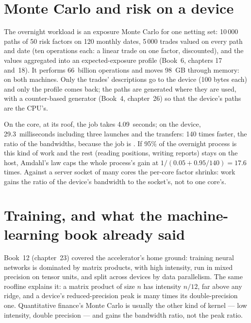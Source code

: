 \section{Monte Carlo and risk on a device}

The overnight workload is an exposure Monte Carlo for one netting set: 10\,000 paths of 50 risk factors on 120 monthly dates, 5\,000 trades
valued on every path and date (ten operations each: a linear trade on one factor, discounted), and the values aggregated into an
expected-exposure profile (Book~6, chapters 17 and~18). It performs 66~billion operations and moves 98~GB through memory:  on both
machines. Only the trades' descriptions go to the device (100 bytes each) and only the profile comes back; the paths are generated where
they are used, with a counter-based generator (Book~4, chapter~26) so that the device's paths are the CPU's.

\label{lst:pl:accelerators-for-quantitative-work:model}

On the core, at its roof, the job takes 4.09~seconds; on the device, 29.3~milliseconds including three launches and the transfers: 140 times
faster, the ratio of the bandwidths, because the job is . If 95\% of the overnight process is this kind of work and the rest
(reading positions, writing reports) stays on the host, Amdahl's law caps the whole process's gain at $1/(0.05 + 0.95/140) = 17.6$ times.
Against a server socket of many cores the per-core factor shrinks:  work gains the ratio of the device's bandwidth to the
socket's, not to one core's.

\section{Training, and what the machine-learning book already said}

Book~12 (chapter~23) covered the accelerator's home ground: training neural networks is dominated by matrix products,  with
high intensity, run in mixed precision on tensor units, and split across devices by data parallelism. The same roofline explains it: a
matrix product of size $n$ has intensity $n/12$, far above any ridge, and a device's reduced-precision peak is many times its
double-precision one. Quantitative finance's Monte Carlo is usually the other kind of kernel --- low intensity, double precision --- and
gains the bandwidth ratio, not the peak ratio.

